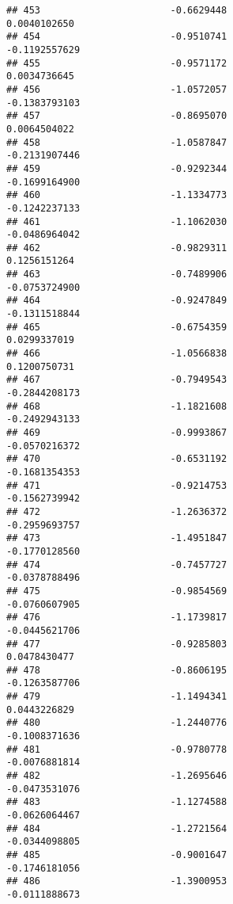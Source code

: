 \documentclass[
]{article}
\begin{document}
\begin{verbatim}
## 453                       -0.6629448                          0.0040102650
## 454                       -0.9510741                         -0.1192557629
## 455                       -0.9571172                          0.0034736645
## 456                       -1.0572057                         -0.1383793103
## 457                       -0.8695070                          0.0064504022
## 458                       -1.0587847                         -0.2131907446
## 459                       -0.9292344                         -0.1699164900
## 460                       -1.1334773                         -0.1242237133
## 461                       -1.1062030                         -0.0486964042
## 462                       -0.9829311                          0.1256151264
## 463                       -0.7489906                         -0.0753724900
## 464                       -0.9247849                         -0.1311518844
## 465                       -0.6754359                          0.0299337019
## 466                       -1.0566838                          0.1200750731
## 467                       -0.7949543                         -0.2844208173
## 468                       -1.1821608                         -0.2492943133
## 469                       -0.9993867                         -0.0570216372
## 470                       -0.6531192                         -0.1681354353
## 471                       -0.9214753                         -0.1562739942
## 472                       -1.2636372                         -0.2959693757
## 473                       -1.4951847                         -0.1770128560
## 474                       -0.7457727                         -0.0378788496
## 475                       -0.9854569                         -0.0760607905
## 476                       -1.1739817                         -0.0445621706
## 477                       -0.9285803                          0.0478430477
## 478                       -0.8606195                         -0.1263587706
## 479                       -1.1494341                          0.0443226829
## 480                       -1.2440776                         -0.1008371636
## 481                       -0.9780778                         -0.0076881814
## 482                       -1.2695646                         -0.0473531076
## 483                       -1.1274588                         -0.0626064467
## 484                       -1.2721564                         -0.0344098805
## 485                       -0.9001647                         -0.1746181056
## 486                       -1.3900953                         -0.0111888673

\end{verbatim}
\end{document}

